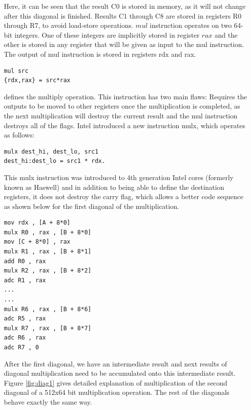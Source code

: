 \documentclass[twocolumn]{svjour3}          %
\begin{document}
Here, it can be seen that the result C0 is stored in memory, as it will not change after this diagonal is finished. Results C1 through C8 are stored in registers R0 through R7, to avoid load-store operations. $mul$ instruction operates on two 64-bit integers. One of these integers are implicitly stored in register $rax$ and the other is stored in any register that will be given as input to the mul instruction. The output of mul instruction is stored in registers rdx and rax. 
\begin{verbatim}
mul src
{rdx,rax} = src*rax
\end{verbatim}
defines the multiply operation. This instruction has two main flaws: Requires the outputs to be moved to other registers once the multiplication is completed, as the next multiplication will destroy the current result and the mul instruction destroys all of the flags. Intel introduced a new instruction mulx, which operates as follows:
\begin{verbatim}
mulx dest_hi, dest_lo, src1
dest_hi:dest_lo = src1 * rdx.
\end{verbatim}
This mulx instruction was introduced to 4th generation Intel cores (formerly known as Haswell) and in addition to being able to define the destination registers, it does not destroy the carry flag, which allows a better code sequence as shown below for the first diagonal of the multiplication.
\begin{verbatim}
mov rdx , [A + 8*0]
mulx R0 , rax , [B + 8*0]
mov [C + 8*0] , rax
mulx R1 , rax , [B + 8*1]
add R0 , rax
mulx R2 , rax , [B + 8*2]
adc R1 , rax
...
...
mulx R6 , rax , [B + 8*6]
adc R5 , rax
mulx R7 , rax , [B + 8*7]
adc R6 , rax
adc R7 , 0
\end{verbatim}

After the first diagonal, we have an intermediate result and next results of diagonal multiplication need to be accumulated onto this intermediate result. Figure \ref{fig:diag1} gives detailed explanation of multiplication of the second diagonal of a 512x64 bit multiplication operation. The rest of the diagonals behave exactly the same way.
\end{document}
